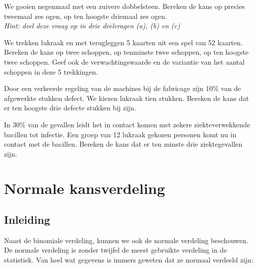 \documentclass[a4paper,12pt, twoside]{article}
\begin{document}
\begin{oefening}
We gooien negenmaal met een zuivere dobbelsteen. Bereken de kans op precies tweemaal zes ogen, op ten hoogste driemaal zes ogen.\\
{\em Hint: deel deze vraag op in drie deelvragen (a), (b) en (c)}
\end{oefening}

\begin{oefening}
We trekken lukraak en met terugleggen 5 kaarten uit een spel van 52 kaarten. Bereken de kans op twee schoppen, op tenminste twee schoppen, op ten hoogste twee schoppen. Geef ook de verwachtingswaarde en de variantie van het aantal schoppen in deze 5 trekkingen.
\end{oefening}

\begin{oefening}
Door een verkeerde regeling van de machines bij de fabricage zijn 10\% van de afgewerkte stukken defect. We kiezen lukraak tien stukken. Bereken de kans dat er ten hoogste drie defecte stukken bij zijn.
\end{oefening}

\begin{oefening}
In 30\% van de gevallen leidt het in contact komen met zekere ziekteverwekkende bacillen tot infectie. Een groep van 12 lukraak gekozen personen komt nu in contact met de bacillen. Bereken de kans dat er ten minste drie ziektegevallen zijn.
\end{oefening}


\pagebreak
\section{Normale kansverdeling}

\subsection{Inleiding}

Naast de binomiale verdeling, kunnen we ook de normale verdeling beschouwen. De normale verdeling is zonder twijfel de meest gebruikte verdeling in de statistiek. Van heel wat gegevens is immers geweten dat ze normaal verdeeld zijn:
\end{document}
